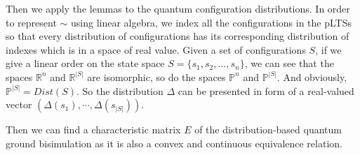 \documentclass[runningheads]{llncs}
\begin{document}

Then we apply the lemmas to the quantum configuration distributions. In order to represent $\sim$ using linear algebra, we index all the configurations in the pLTSs so that every distribution of configurations has its corresponding distribution of indexes which is in a space of real value. Given a set of configurations $S$, if we give a linear order on the state space $S=\{s_1,s_2,\dots,s_n\}$, we can see that the spaces $\mathbb{R}^{n}$ and $\mathbb{R}^{|S|}$ are isomorphic, so do the spaces $\mathbb{P}^{n}$ and $\mathbb{P}^{|S|}$. And obviously, $\mathbb{P}^{|S|}=Dist(S)$. So the distribution $\Delta$ can be presented in form of a real-valued vector $(\Delta(s_1),\cdots,\Delta(s_{|S|}))$.

Then we can find a characteristic matrix $E$ of the distribution-based quantum ground bisimulation as it is also a convex and continuous equivalence relation.
\end{document}
